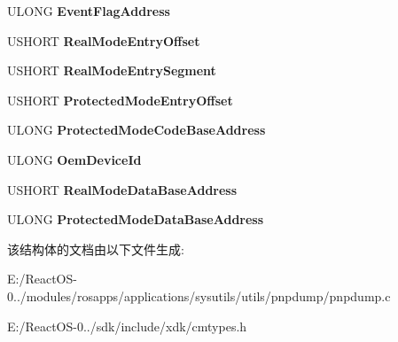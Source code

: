 \begin{DoxyCompactItemize}
U\+L\+O\+NG {\bfseries Event\+Flag\+Address}
\item 
\mbox{\label{struct___c_m___p_n_p___b_i_o_s___i_n_s_t_a_l_l_a_t_i_o_n___c_h_e_c_k_a64ffc2e48a6f705d2d1424a009ad51f8}} 
U\+S\+H\+O\+RT {\bfseries Real\+Mode\+Entry\+Offset}
\item 
\mbox{\label{struct___c_m___p_n_p___b_i_o_s___i_n_s_t_a_l_l_a_t_i_o_n___c_h_e_c_k_a61dcdbc162651b00a2885cf298b7e3ee}} 
U\+S\+H\+O\+RT {\bfseries Real\+Mode\+Entry\+Segment}
\item 
\mbox{\label{struct___c_m___p_n_p___b_i_o_s___i_n_s_t_a_l_l_a_t_i_o_n___c_h_e_c_k_a9c03cb63b56e0650a5f51d4136fd15cd}} 
U\+S\+H\+O\+RT {\bfseries Protected\+Mode\+Entry\+Offset}
\item 
\mbox{\label{struct___c_m___p_n_p___b_i_o_s___i_n_s_t_a_l_l_a_t_i_o_n___c_h_e_c_k_ab8b94307c6a2cf812625db3d6eb652bb}} 
U\+L\+O\+NG {\bfseries Protected\+Mode\+Code\+Base\+Address}
\item 
\mbox{\label{struct___c_m___p_n_p___b_i_o_s___i_n_s_t_a_l_l_a_t_i_o_n___c_h_e_c_k_a3b22f61b545642833d159de5a80e01ba}} 
U\+L\+O\+NG {\bfseries Oem\+Device\+Id}
\item 
\mbox{\label{struct___c_m___p_n_p___b_i_o_s___i_n_s_t_a_l_l_a_t_i_o_n___c_h_e_c_k_a760e17bdf4395f32ee121abd71fd1a6d}} 
U\+S\+H\+O\+RT {\bfseries Real\+Mode\+Data\+Base\+Address}
\item 
\mbox{\label{struct___c_m___p_n_p___b_i_o_s___i_n_s_t_a_l_l_a_t_i_o_n___c_h_e_c_k_aed7801a34b30d44c3064f799fe4fb478}} 
U\+L\+O\+NG {\bfseries Protected\+Mode\+Data\+Base\+Address}
\end{DoxyCompactItemize}


该结构体的文档由以下文件生成\+:\begin{DoxyCompactItemize}
\item 
E\+:/\+React\+O\+S-\/0../modules/rosapps/applications/sysutils/utils/pnpdump/pnpdump.\+c\item 
E\+:/\+React\+O\+S-\/0../sdk/include/xdk/cmtypes.\+h\end{DoxyCompactItemize}
